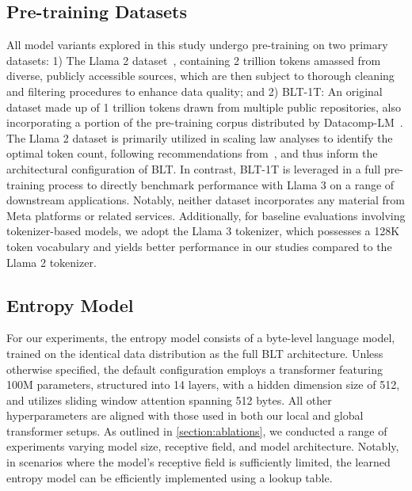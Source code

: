 \subsection{Pre-training Datasets} All model variants explored in this study undergo pre-training on two primary datasets: 1) The Llama 2 dataset~\citep{touvron2023llama}, containing 2 trillion tokens amassed from diverse, publicly accessible sources, which are then subject to thorough cleaning and filtering procedures to enhance data quality; and 2) {\textsc BLT}-1T: An original dataset made up of 1 trillion tokens drawn from multiple public repositories, also incorporating a portion of the pre-training corpus distributed by Datacomp-LM~\citep{li2024datacomp}. The Llama 2 dataset is primarily utilized in scaling law analyses to identify the optimal token count, following recommendations from~\cite{dubey2024llama}, and thus inform the architectural configuration of {\textsc BLT}. In contrast, {\textsc BLT}-1T is leveraged in a full pre-training process to directly benchmark performance with Llama 3 on a range of downstream applications. Notably, neither dataset incorporates any material from Meta platforms or related services. Additionally, for baseline evaluations involving tokenizer-based models, we adopt the Llama 3 tokenizer, which possesses a 128K token vocabulary and yields better performance in our studies compared to the Llama 2 tokenizer.

\subsection{Entropy Model} For our experiments, the entropy model consists of a byte-level language model, trained on the identical data distribution as the full {\textsc BLT} architecture. Unless otherwise specified, the default configuration employs a transformer featuring 100M parameters, structured into 14 layers, with a hidden dimension size of 512, and utilizes sliding window attention spanning 512 bytes. All other hyperparameters are aligned with those used in both our local and global transformer setups. As outlined in \autoref{section:ablations}, we conducted a range of experiments varying model size, receptive field, and model architecture. Notably, in scenarios where the model's receptive field is sufficiently limited, the learned entropy model can be efficiently implemented using a lookup table.

